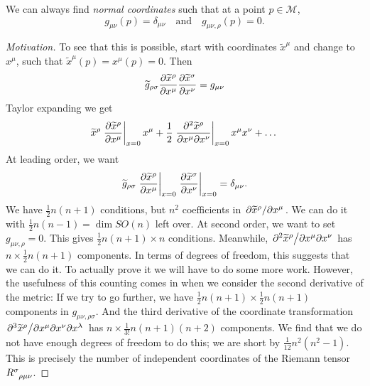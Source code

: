 \begin{claim}
  We can always find \emph{normal coordinates} such that at a point $p \in \mathcal{M}$, 
  \begin{equation}
    g_{\mu\nu}(p) = \delta_{\mu\nu} \quad \text{and} \quad g_{\mu\nu, \rho}(p) = 0.
  \end{equation}
\end{claim}
\begin{proof}[Motivation]
  To see that this is possible, start with coordinates $\widetilde x^\mu$ and change to $x^\mu$, such that $\widetilde x^\mu(p) = x^\mu(p) = 0$. Then
  \begin{equation}
    \widetilde{g}_{\rho\sigma} \pdv{\widetilde{x}^\rho}{x^\mu} \pdv{\widetilde{x}^\sigma}{x^\nu} = g_{\mu\nu}
  \end{equation}
  Taylor expanding we get
  \begin{equation}
    \widetilde{x}^\rho \left.\pdv{\widetilde{x}^\rho}{x^\mu}\right\rvert_{x = 0} x^\mu + \frac{1}{2} \left.\frac{\partial^2 \widetilde x^\rho}{\partial x^\mu \partial x^\nu}\right\rvert_{x = 0} x^\mu x^\nu + \dots
  \end{equation}
  At leading order, we want
  \begin{equation}
    \widetilde{g}_{\rho\sigma} \left.\pdv{\widetilde{x}^\rho}{x^\mu}\right\rvert_{x = 0} \left.\pdv{\widetilde{x}^\sigma}{x^\nu}\right\rvert_{x = 0} = \delta_{\mu\nu}.
  \end{equation}
  We have $\frac{1}{2} n(n+1)$ conditions, but $n^2$ coefficients in $\pdv*{\widetilde{x}^{\rho}}{x^\mu}$. We can do it with $\frac{1}{2} n(n-1) = \dim SO(n)$ left over.
  At second order, we want to set $g_{\mu\nu,\rho} = 0$. This gives $\frac{1}{2} n(n+1) \times n$ conditions. Meanwhile, $\flatfrac{\partial^2\widetilde{x}^\rho}{\partial x^\mu \partial x^\nu}$ has $n \times \frac{1}{2} n(n+1)$ components. In terms of degrees of freedom, this suggests that we can do it. To actually prove it we will have to do some more work. However, the usefulness of this counting comes in when we consider the second derivative of the metric:
  If we try to go further, we have $\frac{1}{2} n (n+1) \times \frac{1}{2} n(n+1)$ components in $g_{\mu\nu, \rho\sigma}$. And the third derivative of the coordinate transformation $\flatfrac{\partial^3 \widetilde x^\rho}{\partial x^\mu \partial x^\nu \partial x^\lambda}$ has $n \times \frac{1}{3!} n (n + 1) (n + 2)$ components.
  We find that we do not have enough degrees of freedom to do this; we are short by $\frac{1}{12}n^2 (n^2 - 1)$.
  This is precisely the number of independent coordinates of the Riemann tensor $R \indices{^\sigma_{\rho\mu\nu}}$.


\end{proof}
